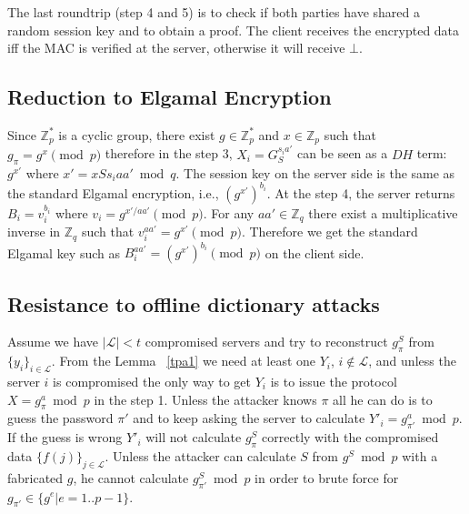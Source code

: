 The last roundtrip (step 4 and 5) is to check if both parties have
shared a random session key and to obtain a proof. The client receives
the encrypted data iff the MAC is verified at the server, otherwise it
will receive $\bot$.

\subsection{Reduction to Elgamal Encryption}
Since $\mathbb{Z}_p^*$ is a cyclic group, there exist $g \in
\mathbb{Z}_p^*$ and $x \in \mathbb{Z}_p$ such that $g_{\pi} = g^x
\pmod p$ therefore in the step 3, $X_i = G_S^{s_ia'}$ can be
seen as a $DH$ term: $g^{x'}$ where $x' = xSs_iaa' \bmod q$. The
session key on the server side is the same as the standard Elgamal
encryption, i.e., $(g^{x'})^{b_i}$.
At the step 4, the server returns $B_i = v_i^{b_i}$ where $v_i =
g^{x'/aa'} \pmod p$. For any $aa' \in \mathbb{Z}_q$ there exist a
multiplicative inverse in $\mathbb{Z}_q$ such that $v_i^{aa'} = g^{x'}
\pmod p$. Therefore we get the standard Elgamal key such as $B_i^{aa'}
= (g^{x'})^{b_i} \pmod p$ on the client side.

\subsection{Resistance to offline dictionary attacks}
Assume we have $|\mathcal{L}| < t$ compromised servers and try to
reconstruct $g_{\pi}^S$ from $\{y_i\}_{i \in \mathcal{L}}$.
From the Lemma ~\ref{tpa1} we need at least one $Y_i$, $i \notin
\mathcal{L}$, and unless the server $i$ is compromised the only
way to get $Y_i$ is to issue the protocol $X = g_{\pi}^a \bmod
p$ in the step 1.
Unless the attacker knows $\pi$ all he can do is to guess the
password $\pi'$ and to keep asking the server to calculate $Y'_i =
g_{\pi'}^a \bmod p$. If the guess is wrong $Y'_i$ will not
calculate $g_{\pi}^S$ correctly with the compromised data $\{f(j)\}_{j
\in \mathcal{L}}$.
Unless the attacker can calculate $S$ from $g^S \bmod p$ with a
fabricated $g$, he cannot calculate $g_{\pi'}^S \bmod p$ in
order to brute force for $g_{\pi'} \in \{g^e | e = 1..p-1\}$.

